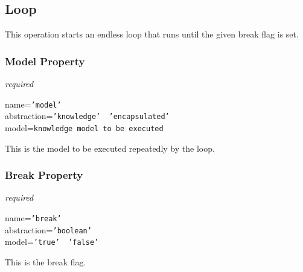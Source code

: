 %
%
%
%
%
%

\subsection{Loop}
\label{loop_heading}

This operation starts an endless loop that runs until the given break flag is
set.

\subsubsection{Model Property}

\emph{required}

name=\texttt{'model'}\\
abstraction=\texttt{'knowledge' \vline\ 'encapsulated'}\\
model=\texttt{knowledge model to be executed}

This is the model to be executed repeatedly by the loop.

\subsubsection{Break Property}

\emph{required}

name=\texttt{'break'}\\
abstraction=\texttt{'boolean'}\\
model=\texttt{'true' \vline\ 'false'}

This is the break flag.
